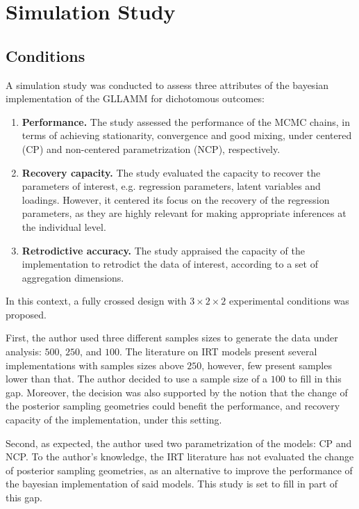 \chapter{Simulation Study} \label{chap:simulation}

\section{Conditions} \label{sec:conditions}

A simulation study was conducted to assess three attributes of the bayesian implementation of the GLLAMM for dichotomous outcomes:
%
\begin{enumerate}
	\item \textbf{Performance.} The study assessed the performance of the MCMC chains, in terms of achieving stationarity, convergence and good mixing,  under centered (CP) and non-centered parametrization (NCP), respectively.
	\item \textbf{Recovery capacity.} The study evaluated the capacity to recover the parameters of interest, e.g. regression parameters, latent variables and loadings. However, it centered its focus on the recovery of the regression parameters, as they are highly relevant for making appropriate inferences at the individual level.
	\item \textbf{Retrodictive accuracy.} The study appraised the capacity of the implementation to retrodict the data of interest, according to a set of aggregation dimensions.
\end{enumerate} 

\noindent In this context, a fully crossed design with $3 \times 2 \times 2$ experimental conditions was proposed. 

First, the author used three different samples sizes to generate the data under analysis: $500$, $250$, and $100$. The literature on IRT models present several implementations with samples sizes above $250$, however, few present samples lower than that. The author decided to use a sample size of a $100$ to fill in this gap. Moreover, the decision was also supported by the notion that the change of the posterior sampling geometries could benefit the performance, and recovery capacity of the implementation, under this setting.

Second, as expected, the author used two parametrization of the models: CP and NCP. To the author's knowledge, the IRT literature has not evaluated the change of posterior sampling geometries, as an alternative to improve the performance of the bayesian implementation of said models. This study is set to fill in part of this gap.

